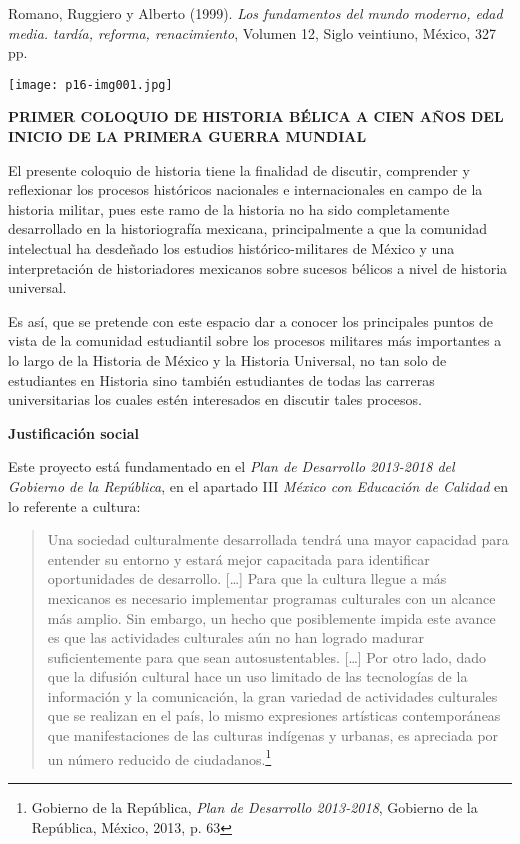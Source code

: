 \begin{footnotesize}
Romano, Ruggiero y Alberto (1999). \textit{Los fundamentos del mundo
moderno, edad media. tardía, reforma, renacimiento}, Volumen 12, Siglo
veintiuno, México, 327 pp.


\bigskip
{\centering  \texttt{[image: p16-img001.jpg]} \par}

\bigskip
{\centering \textbf{PRIMER COLOQUIO DE HISTORIA BÉLICA A CIEN AÑOS 
DEL INICIO DE LA PRIMERA GUERRA MUNDIAL}
\par}
El presente coloquio de historia tiene la finalidad de discutir, comprender
y reflexionar los procesos históricos nacionales e internacionales en campo
de la historia militar, pues este ramo de la historia no ha sido
completamente desarrollado en la historiografía mexicana, principalmente a
que la comunidad intelectual ha desdeñado los estudios histórico-militares
de México y una interpretación de historiadores mexicanos sobre sucesos
bélicos a nivel de historia universal.


Es así, que se pretende con este espacio dar a conocer los principales
puntos de vista de la comunidad estudiantil sobre los procesos militares
más importantes a lo largo de la Historia de México y la Historia
Universal, no tan solo de estudiantes en Historia sino también estudiantes
de todas las carreras universitarias los cuales estén interesados en
discutir tales procesos.

\medskip
\textbf{Justificación social}
\enlargethispage{1\baselineskip}

Este proyecto está fundamentado en el \textit{Plan de Desarrollo 2013-2018
del Gobierno de la República}, en el apartado III \textit{México con
Educación de Calidad} en lo referente a cultura:

\begin{quotation}
Una sociedad culturalmente desarrollada tendrá una mayor capacidad para
entender su entorno y estará mejor capacitada para identificar
oportunidades de desarrollo. […] Para que la cultura llegue a más mexicanos
es necesario implementar programas culturales con un alcance más amplio.
Sin embargo, un hecho que posiblemente impida este avance es que las
actividades culturales aún no han logrado madurar suficientemente para que
sean autosustentables. […] Por otro lado, dado que la difusión cultural
hace un uso limitado de las tecnologías de la información y la
comunicación, la gran variedad de actividades culturales que se realizan en
el país, lo mismo expresiones artísticas contemporáneas que manifestaciones
de las culturas indígenas y urbanas, es apreciada por un número reducido de
ciudadanos.\footnote{Gobierno de la República, \textit{Plan de Desarrollo
2013-2018},  Gobierno de la República, México, 2013, p. 63}
\end{quotation}


\end{footnotesize}

